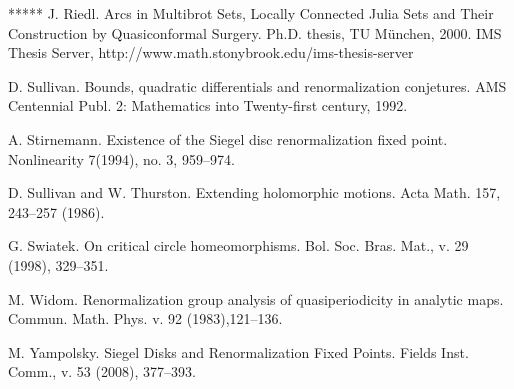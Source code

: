 \begin{thebibliography}{*****}
 J. Riedl. Arcs in Multibrot Sets, Locally Connected Julia Sets and Their Construction by Quasiconformal Surgery. Ph.D. thesis, TU M\"unchen, 2000. IMS Thesis Server,  http://www.math.stonybrook.edu/ims-thesis-server

 D. Sullivan. Bounds, quadratic differentials and renormalization conjetures.
  AMS Centennial Publ. 2: Mathematics into Twenty-first century, 1992. 


 A. Stirnemann. Existence of the Siegel disc renormalization fixed point. Nonlinearity 7(1994), no. 3, 959--974.

 D. Sullivan and W. Thurston. Extending holomorphic motions. Acta Math. 157, 243--257 (1986).


 G. Swiatek. On critical circle homeomorphisms. Bol. Soc. Bras. Mat., v. 29 (1998), 329--351.





 M. Widom. Renormalization group analysis of quasiperiodicity in analytic maps. Commun. Math. Phys. v. 92 (1983),121--136.

 




 M. Yampolsky.  Siegel Disks and Renormalization Fixed Points.
  Fields Inst. Comm., v. 53 (2008), 377--393.  




\end{thebibliography}
